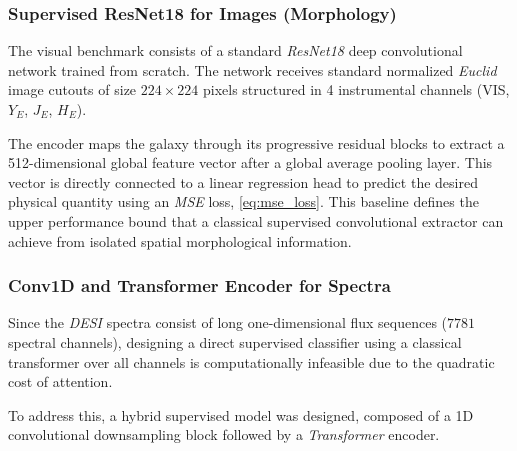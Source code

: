 \subsubsection{Supervised ResNet18 for Images (Morphology)}

The visual benchmark consists of a standard \textit{ResNet18} deep convolutional network \autocite{ar:he-2016} trained from scratch. The network receives standard normalized \textit{Euclid} image cutouts of size $224 \times 224$ pixels structured in 4 instrumental channels (VIS, $Y_E$, $J_E$, $H_E$).

The encoder maps the galaxy through its progressive residual blocks to extract a 512-dimensional global feature vector after a global average pooling layer. This vector is directly connected to a linear regression head to predict the desired physical quantity using an \textit{\gls{MSE}} loss, \cref{eq:mse_loss}. This baseline defines the upper performance bound that a classical supervised convolutional extractor can achieve from isolated spatial morphological information.

\subsubsection{Conv1D and Transformer Encoder for Spectra}

Since the \textit{\gls{DESI}} spectra consist of long one-dimensional flux sequences ($7781$ spectral channels), designing a direct supervised classifier using a classical transformer over all channels is computationally infeasible due to the quadratic cost of attention.

To address this, a hybrid supervised model was designed, composed of a 1D convolutional downsampling block followed by a \textit{Transformer} encoder.

